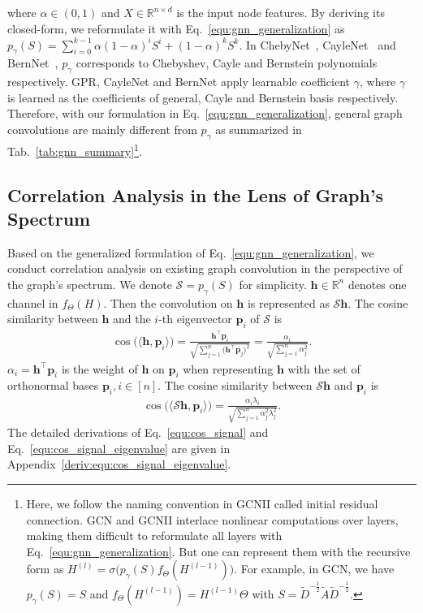 \documentclass[nohyperref]{article}
\theoremstyle{plain}
\theoremstyle{definition}
\theoremstyle{remark}
\begin{document}
where $\alpha\in(0, 1)$ and $X\in\mathbb R^{n\times d}$ is the input node features.
By deriving its closed-form, we reformulate it with Eq.~\ref{equ:gnn_generalization} as $p_{\gamma}(S)=\sum_{i=0}^{k-1}\alpha(1-\alpha)^i S^i+(1-\alpha)^k S^k$.
In ChebyNet~\cite{defferrard2016convolutional}, CayleNet~\cite{8521593} and BernNet~\cite{he2021bernnet}, $p_{\gamma}$ corresponds to Chebyshev, Cayle and Bernstein polynomials respectively.
GPR, CayleNet and BernNet apply learnable coefficient $\gamma$, where $\gamma$ is learned as the coefficients of general, Cayle and Bernstein basis respectively.
Therefore, with our formulation in Eq.~\ref{equ:gnn_generalization}, general graph convolutions are mainly different from $p_{\gamma}$ as summarized in Tab.~\ref{tab:gnn_summary}\footnote{Here, we follow the naming convention in GCNII called initial residual connection. GCN and GCNII interlace nonlinear computations over layers, making them difficult to reformulate all layers with Eq.~\ref{equ:gnn_generalization}. But one can represent them with the recursive form as $H^{(l)}=\sigma\bigl(p_{\gamma}(S)f_{\Theta}(H^{(l-1)})\bigr)$. For example, in GCN, we have $p_{\gamma}(S)=S$ and $f_{\Theta}(H^{(l-1)})=H^{(l-1)}\Theta$ with $S=\tilde{D}^{-\frac{1}{2}}\tilde{A}\tilde{D}^{-\frac{1}{2}}$.}.

\subsection{Correlation Analysis in the Lens of Graph's Spectrum}
\label{sec:correlation_analysis}

Based on the generalized formulation of Eq.~\ref{equ:gnn_generalization}, we conduct correlation analysis on existing graph convolution in the perspective of the graph's spectrum.
We denote $\mathcal S=p_{\gamma}(S)$  for simplicity.
$\bm h\in\mathbb R^n$ denotes one channel in $f_{\Theta}(H)$.
Then the convolution on $\bm h$ is represented as $\mathcal S\bm h$.
The cosine similarity between $\bm h$ and the $i$-th eigenvector $\bm p_i$ of $\mathcal S$ is
\begin{equation}
	\label{equ:cos_signal}
	\begin{aligned}
		\cos\bigl(\langle \bm h, \bm p_i\rangle\bigr)
		=\frac{\bm h^{\top}\bm p_i}
		{\sqrt{\sum^n_{j=1}\bigl(\bm h^{\top}\bm p_j\bigr)^2}}
		=\frac{\alpha_i}{\sqrt{\sum^n_{j=1}\alpha_j^2}}.
	\end{aligned}
\end{equation}
$\alpha_i=\bm h^{\top}\bm p_i$ is the weight of $\bm h$ on $\bm p_i$ when representing $\bm h$ with the set of orthonormal bases $\bm p_i,i\in[n]$.
The cosine similarity between $\mathcal S\bm h$ and $\bm p_i$ is
\begin{equation}
	\label{equ:cos_signal_eigenvalue}
	\begin{aligned}
		\cos\bigl(\langle \mathcal S\bm h, \bm p_i\rangle\bigr)
		=\frac{\alpha_i\lambda_i}{\sqrt{\sum^n_{j=1}\alpha_j^2\lambda_j^2}}.
	\end{aligned}
\end{equation}
The detailed derivations of Eq.~\ref{equ:cos_signal} and Eq.~\ref{equ:cos_signal_eigenvalue} are given in Appendix~\ref{deriv:equ:cos_signal_eigenvalue}.
\end{document}
